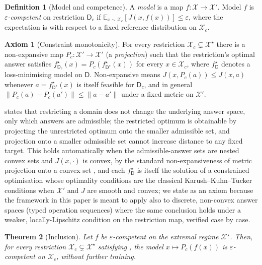 \documentclass[11pt,twocolumn,a4paper]{article}
\theoremstyle{rdm}
\newtheorem{theorem}{Theorem}[section]
\theoremstyle{definition}
\newtheorem{definition}[theorem]{Definition}
\newtheorem{axiom}{Axiom}
\theoremstyle{remark}
\newcommand{\Cands}{\mathcal{X}}
\newcommand{\Dom}{\mathsf{D}}
\newcommand{\eps}{\varepsilon}
\begin{document}
\begin{definition}[Model and competence]
\label{def:model-comp}
A \emph{model} is a map $f: \Cands \to \Cands'$. Model $f$ is
\emph{$\eps$-competent} on restriction $\Dom_c$ if
$\mathbb{E}_{x\sim \Cands_c}[J(x,f(x))] \le \eps$, where the expectation is
with respect to a fixed reference distribution on $\Cands_c$.
\end{definition}

\begin{axiom}[Constraint monotonicity]
\label{ax:monotone}
For every restriction $\Cands_c \subsetneq \Cands^\star$ there is a
non-expansive map $P_c: \Cands' \to \Cands'$ (a \emph{projection}) such that
the restriction's optimal answer satisfies
$f^\star_{\Dom_c}(x) = P_c(f^\star_{\Dom^\star}(x))$ for every
$x \in \Cands_c$, where $f^\star_{\Dom}$ denotes a loss-minimising model on
$\Dom$. Non-expansive means $J(x, P_c(a)) \le J(x,a)$ whenever
$a=f^\star_{\Dom^\star}(x)$ is itself feasible for $\Dom_c$, and in general
$\|P_c(a) - P_c(a')\| \le \|a-a'\|$ under a fixed metric on $\Cands'$.
\end{axiom}

 states that restricting a domain does not change the
underlying answer space, only which answers are admissible; the restricted
optimum is obtainable by projecting the unrestricted optimum onto the
smaller admissible set, and projection onto a smaller admissible set cannot
increase distance to any fixed target. This holds automatically when the
admissible-answer sets are nested convex sets and $J(x,\cdot)$ is convex, by
the standard non-expansiveness of metric projection onto a convex set
\citep{boyd2004}, and each $f^\star_\Dom$ is itself the solution of a
constrained optimisation whose optimality conditions are the classical
Karush--Kuhn--Tucker conditions \citep{kuhntucker1951} when $\Cands'$ and
$J$ are smooth and convex; we
state  as an axiom because the framework in this paper is meant to apply
also to discrete, non-convex answer spaces (typed operation sequences) where
the same conclusion holds under a weaker, locally-Lipschitz condition on the
restriction map, verified case by case.

\begin{theorem}[Inclusion]
\label{thm:inclusion}
Let $f$ be $\eps$-competent on the extremal regime $\Cands^\star$. Then, for
every restriction $\Cands_c \subsetneq \Cands^\star$ satisfying
, the model $x \mapsto P_c(f(x))$ is $\eps$-competent on
$\Cands_c$, without further training.
\end{theorem}
\end{document}
